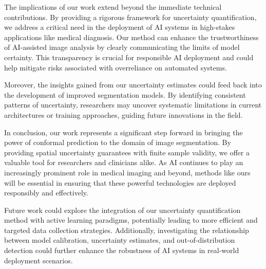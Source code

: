 The implications of our work extend beyond the immediate technical contributions. By providing a rigorous framework for uncertainty quantification, we address a critical need in the deployment of AI systems in high-stakes applications like medical diagnosis. Our method can enhance the trustworthiness of AI-assisted image analysis by clearly communicating the limits of model certainty. This transparency is crucial for responsible AI deployment and could help mitigate risks associated with overreliance on automated systems.

Moreover, the insights gained from our uncertainty estimates could feed back into the development of improved segmentation models. By identifying consistent patterns of uncertainty, researchers may uncover systematic limitations in current architectures or training approaches, guiding future innovations in the field.

In conclusion, our work represents a significant step forward in bringing the power of conformal prediction to the domain of image segmentation. By providing spatial uncertainty guarantees with finite sample validity, we offer a valuable tool for researchers and clinicians alike. As AI continues to play an increasingly prominent role in medical imaging and beyond, methods like ours will be essential in ensuring that these powerful technologies are deployed responsibly and effectively.

Future work could explore the integration of our uncertainty quantification method with active learning paradigms, potentially leading to more efficient and targeted data collection strategies. Additionally, investigating the relationship between model calibration, uncertainty estimates, and out-of-distribution detection could further enhance the robustness of AI systems in real-world deployment scenarios.